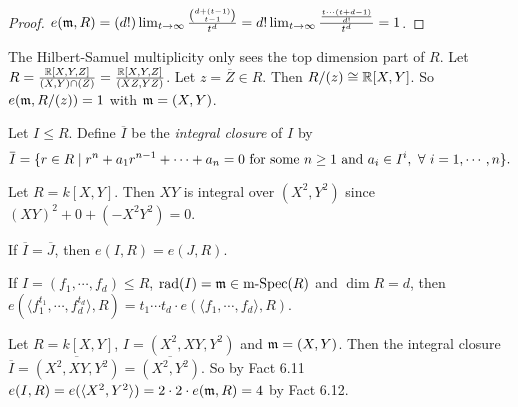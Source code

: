 \begin{proof}
    $e(\mathfrak{m},R) = (d!) \lim_{t \to \infty} \frac{\binom{d+(t-1)}{t-1}}{t^{d}} = d! \lim_{t \to \infty} \frac{\frac{t \cdots (t+d-1)}{d!}}{t^{d}} = 1$.
\end{proof}

\begin{fact}
    The Hilbert-Samuel multiplicity only sees the top dimension part of $R$. Let $R = \frac{\mathbb{R}[X,Y,Z]}{(X,Y) \cap (Z)} = \frac{\mathbb{R}[X,Y,Z]}{(XZ,YZ)}$. Let $z = \overbar{Z} \in R$. Then $R/(z) \cong \mathbb{R}[X,Y]$. So $e(\mathfrak{m},R/(z)) = 1$ with $\mathfrak{m} = (X,Y)$.
\end{fact}

\begin{definition}
    Let $I \leq R$. Define $\overbar{I}$ be the \emph{integral closure} of $I$ by 
    \[\overbar{I} = \{r \in R \mid r^{n} + a_1r^{n-1} + \cdots + a_n = 0 \text{ for some $n \geq 1$ and $a_i \in I^{i}$}, \fa i = 1,\cdots,n\}.\]
\end{definition}

\begin{example}
    Let $R = k[X,Y]$. Then $XY$ is integral over $(X^{2},Y^{2})$ since $(XY)^{2} + 0 + (-X^{2}Y^{2}) = 0$.
\end{example}

\begin{fact}
    If $\overbar{I} = \overbar{J}$, then $e(I,R) = e(J,R)$.
\end{fact}

\begin{fact}
    If $I = (f_1,\cdots,f_d) \leq R$, $\operatorname{rad}(I) = \mathfrak{m} \in \operatorname{m-Spec}(R)$ and $\dim R = d$, then $e(\langle f_1^{t_1},\cdots,f_d^{t_d} \rangle,R) = t_1 \cdots t_d \cdot e(\langle f_1,\cdots,f_d \rangle,R)$.
\end{fact}

\begin{example}
    Let $R = k[X,Y]$, $I = (X^{2},XY,Y^{2})$ and $\mathfrak{m} = (X,Y)$. Then the integral closure $\overbar{I} = \overbar{(X^{2},XY,Y^{2})} = \overbar{(X^{2},Y^{2})}$. So by Fact 6.11 $e(I,R) = e(\langle X^{2},Y^{2} \rangle) = 2 \cdot 2 \cdot e(\mathfrak{m},R) = 4$ by Fact 6.12.
\end{example}


